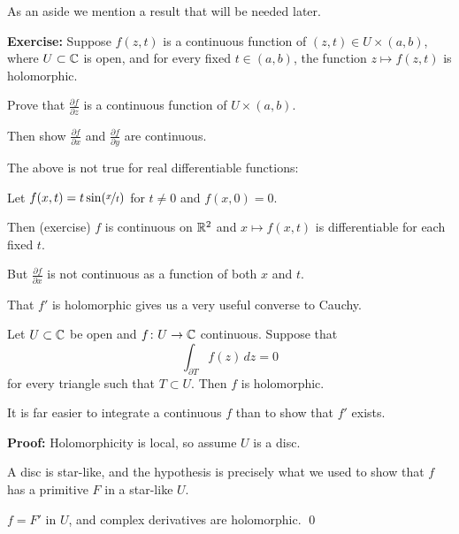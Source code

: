 \documentclass[10pt,aspectratio=169]{beamer}
\begin{document}
\begin{frame}

As an aside we mention a result that will be needed later.

\medskip
\pause

\textbf{Exercise:}
Suppose $f(z,t)$ is a continuous function of $(z,t) \in U \times (a,b)$,
where $U \subset {\mathbb{C}}$ is open, and for every fixed $t \in (a,b)$, the function
$z \mapsto f(z,t)$ is holomorphic.

\pause

Prove that
$\frac{\partial f}{\partial z}$ is a continuous function of $U \times
(a,b)$.

\pause

Then show
$\frac{\partial f}{\partial x}$
and
$\frac{\partial f}{\partial y}$ are continuous.

\medskip
\pause

The above is not true for real differentiable functions:

\medskip
\pause

Let $f(x,t) = t \sin(\nicefrac{x}{t})$ for $t \not= 0$ and $f(x,0) =  0$.

\medskip
\pause

Then (exercise) $f$ is continuous on ${\mathbb{R}}^2$ and
$x \mapsto f(x,t)$ is differentiable for each fixed $t$.

\medskip
\pause

But $\frac{\partial f}{\partial x}$ is not continuous as a function of both
$x$ and $t$.
\end{frame}

\begin{frame}
That $f'$ is holomorphic gives us a very useful converse to Cauchy.

\pause

\begin{theorem}[Morera]
Let $U \subset {\mathbb{C}}$ be open and $f \colon U \to {\mathbb{C}}$ continuous.
Suppose that
\[
\int_{\partial T} f(z) \, dz = 0
\]
for every triangle such that $T \subset U$.
\pause
Then $f$ is holomorphic.
\end{theorem}

\pause

It is far easier to integrate a continuous $f$ than to show that $f'$ exists.

\medskip
\pause

\textbf{Proof:}
Holomorphicity is local, so assume $U$ is a disc.

\medskip
\pause

A disc is star-like, and the hypothesis is precisely what we used
to show that $f$ has a primitive $F$ in a star-like $U$.

\medskip
\pause

$f = F'$ in $U$, and complex derivatives are holomorphic.
\qed

\end{frame}
\end{document}
